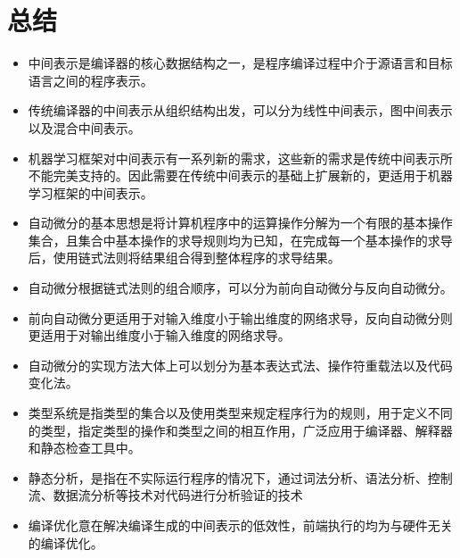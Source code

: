 \documentclass[letterpaper,10pt,english]{sphinxmanual}
\begin{document}
\section{总结}
\label{\detokenize{chapter_frontend_and_ir/summary:id1}}\label{\detokenize{chapter_frontend_and_ir/summary::doc}}\begin{itemize}
\item {} 
\sphinxAtStartPar
中间表示是编译器的核心数据结构之一，是程序编译过程中介于源语言和目标语言之间的程序表示。

\item {} 
\sphinxAtStartPar
传统编译器的中间表示从组织结构出发，可以分为线性中间表示，图中间表示以及混合中间表示。

\item {} 
\sphinxAtStartPar
机器学习框架对中间表示有一系列新的需求，这些新的需求是传统中间表示所不能完美支持的。因此需要在传统中间表示的基础上扩展新的，更适用于机器学习框架的中间表示。

\item {} 
\sphinxAtStartPar
自动微分的基本思想是将计算机程序中的运算操作分解为一个有限的基本操作集合，且集合中基本操作的求导规则均为已知，在完成每一个基本操作的求导后，使用链式法则将结果组合得到整体程序的求导结果。

\item {} 
\sphinxAtStartPar
自动微分根据链式法则的组合顺序，可以分为前向自动微分与反向自动微分。

\item {} 
\sphinxAtStartPar
前向自动微分更适用于对输入维度小于输出维度的网络求导，反向自动微分则更适用于对输出维度小于输入维度的网络求导。

\item {} 
\sphinxAtStartPar
自动微分的实现方法大体上可以划分为基本表达式法、操作符重载法以及代码变化法。

\item {} 
\sphinxAtStartPar
类型系统是指类型的集合以及使用类型来规定程序行为的规则，用于定义不同的类型，指定类型的操作和类型之间的相互作用，广泛应用于编译器、解释器和静态检查工具中。

\item {} 
\sphinxAtStartPar
静态分析，是指在不实际运行程序的情况下，通过词法分析、语法分析、控制流、数据流分析等技术对代码进行分析验证的技术

\item {} 
\sphinxAtStartPar
编译优化意在解决编译生成的中间表示的低效性，前端执行的均为与硬件无关的编译优化。

\end{itemize}
\end{document}
